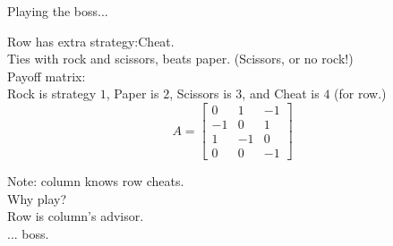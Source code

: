 






\begin{frame}{Playing the boss...}

Row has extra strategy:Cheat. \\ 
Ties with rock and scissors, beats paper. (Scissors, or no rock!)\\ 
Payoff matrix: \\ Rock is strategy $1$, Paper is $2$, Scissors is $3$, and Cheat is $4$ (for row.) \\ 

\[ A= \left[ \begin{array}{ccc}
0 & 1 & -1  \\
-1 & 0 &  1 \\
1 & -1 & 0  \\
0 & 0 & -1
\end{array} \right]\]

Note: column knows row cheats.  \\
Why play? \\ 
Row is column's advisor. \\  ... boss. 


\end{frame}


